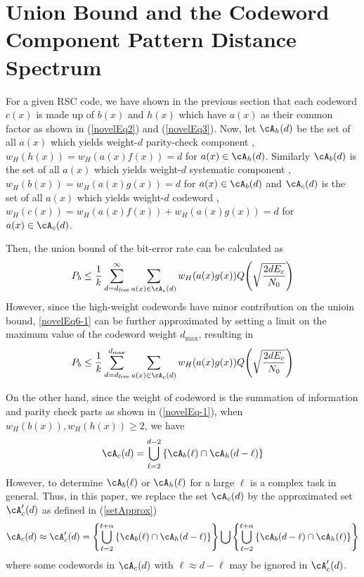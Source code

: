 \section{Union Bound and the Codeword Component Pattern Distance Spectrum}
\label{sec4}
For a given RSC code, we have shown in the previous section that each codeword $c(x)$ is made up of $b(x)$ and $h(x)$ which have $a(x)$ as their common factor as shown in (\ref{novelEq2}) and (\ref{novelEq3}).
 Now, let $\cA_h(d)$ be the set of all $a(x)$ which yields weight-$d$ parity-check component \ie, $w_H(h(x))=w_H(a(x)f(x))=d$ for $a(x) \in \cA_h(d)$. 
Similarly $\cA_b(d)$ is the set of all $a(x)$ which yields weight-$d$ systematic component \ie, $w_H(b(x))=w_H(a(x)g(x))=d$ for $a(x) \in \cA_b(d)$
 and $\cA_c(d)$ is the set of all $a(x)$ which yields weight-$d$ codeword \ie, $w_H(c(x))=w_H(a(x)f(x))+ w_H(a(x)g(x))=d$ for $a(x) \in \cA_c(d)$.  

Then, the union bound of the bit-error rate can be calculated as
\begin{align}
P_b \leq \frac{1}{k} \sum_{d=d_{\text{free}}}^{\infty} \sum_{a(x) \in \cA_c(d)}w_H(a(x)g(x)) Q\Bigg( \sqrt{\frac{2dE_c}{N_0}}\Bigg)
\label{novelEq6-1}
\end{align}
However, since the high-weight codewords have minor contribution on the unioin bound, \eqref{novelEq6-1} can be further approximated by setting a limit on the maximum value of the codeword weight $d_{\text{max}}$, resulting in
\begin{align}
P_b \leq \frac{1}{k} \sum_{d=d_{\text{free}}}^{d_{\text{max}}} \sum_{a(x) \in \cA_c(d)}w_H(a(x)g(x)) Q\Bigg( \sqrt{\frac{2dE_c}{N_0}}\Bigg)
\label{novelEq7}
\end{align}

On the other hand, since the weight of codeword is the summation of information and parity check parts as shown in (\ref{novelEq-1}), when $w_H(b(x)), w_H(h(x)) \geq 2$, we have
\begin{align}
\cA_c(d) = \bigcup_{\ell = 2}^{d-2} \left\{\cA_b(\ell) \cap \cA_h(d-\ell)\right\}
\label{Eq:exactset}
\end{align}
However, to determine $\cA_b(\ell)$ or $\cA_h(\ell)$ for a large $\ell$ is a complex task in general. Thus, in this paper, we replace the set $\cA_c(d)$ by the approximated set $\cA_c'(d)$ as defined in  (\ref{setApprox})
\begin{align}
\cA_c(d) \approx \cA_c'(d) = \left\{\bigcup_{\ell = 2}^{\ell+\alpha} \left\{\cA_b(\ell) \cap \cA_h(d-\ell)\right\}\right\}\bigcup\left\{\bigcup_{\ell = 2}^{\ell+\alpha} \left\{\cA_b(d-\ell) \cap \cA_h(\ell)\right\}\right\}
\label{setApprox}
\end{align}
where some codewords in $\cA_c(d)$ with $\ell \approx d-\ell$ may be ignored in $\cA_c'(d)$.

